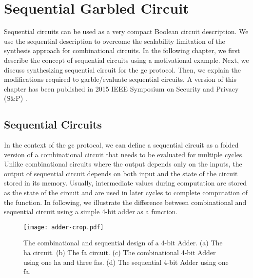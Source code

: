 \chapter{Sequential Garbled Circuit}\label{chap:seq}
Sequential circuits can be used as a very compact Boolean circuit description. We use the sequential description to overcome the scalability limitation of the synthesis approach for combinational circuits.
In the following chapter, we first describe the concept of sequential circuits using a motivational example.
Next, we discuss synthesizing sequential circuit for the \acrshort{gc} protocol.
Then, we explain the modifications required to garble/evaluate sequential circuits.
A version of this chapter has been published in 2015 IEEE Symposium on Security and Privacy (S\&P) \cite{songhori2015tinygarble}.

\section{Sequential Circuits}\label{sec:seq-seq}
In the context of the \acrshort{gc} protocol, we can define a sequential circuit as a folded version of a combinational circuit that needs to be evaluated for multiple cycles.
Unlike combinational circuits where the output depends only on the inputs, the output of sequential circuit depends on both input and the state of the circuit stored in its memory.
Usually, intermediate values during computation are stored as the state of the circuit and are used in later cycles to complete computation of the function.
In following, we illustrate the difference between combinational and sequential circuit using a simple 4-bit adder as a function.

\begin{figure}
    \centering
    \texttt{[image: adder-crop.pdf]}
    \caption{The combinational and sequential design of a 4-bit Adder.
  (a) The \acrshort{ha} circuit.
  (b) The \acrshort{fa} circuit.
  (c) The combinational 4-bit Adder using one \acrshort{ha} and three \acrshort{fa}s.
  (d) The sequential 4-bit Adder using one \acrshort{fa}.}\label{fig:combSeq}
\end{figure}

